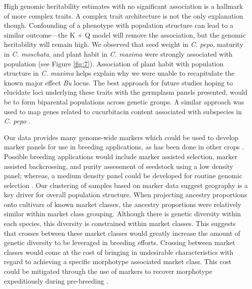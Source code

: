 \documentclass[utf8]{FrontiersinHarvard} %
\begin{document}
High genomic heritability estimates with no significant association is a hallmark of more complex traits. A complex trait architecture is not the only explanation though. Confounding of a phenotype with population structure can lead to a similar outcome---the K + Q model will remove the association, but the genomic heritability will remain high. We observed that seed weight in \textit{C. pepo}, maturity in \textit{C. moschata}, and plant habit in \textit{C. maxima} were strongly associated with population (see Figure \ref{fig:7}). Association of plant habit with population structure in \textit{C. maxima} helps explain why we were unable to recapitulate the known major effect \textit{Bu} locus. The best approach for future studies hoping to elucidate loci underlying these traits with the germplasm panels presented, would be to form biparental populations across genetic groups. A similar approach was used to map genes related to cucurbitacin content associated with subspecies in \textit{C. pepo} \citep{Brzozowski2020}.

Our data provides many genome-wide markers which could be used to develop marker panels for use in breeding applications, as has been done in other crops \citep{Arbelaez2019}. Possible breeding applications would include marker assisted selection, marker assisted backcrossing, and purity assessment of seedstock using a low density panel; whereas, a medium density panel could be developed for routine genomic selection \citep{Cerioli2022}. Our clustering of samples based on marker data suggest geography is a key driver for overall population structure. When projecting ancestry proportions onto cultivars of known market classes, the ancestry proportions were relatively similar within market class grouping. Although there is genetic diversity within each species, this diversity is constrained within market classes. This suggests that crosses between these market classes would greatly increase the amount of genetic diversity to be leveraged in breeding efforts. Crossing between market classes would come at the cost of bringing in undesirable characteristics with regard to achieving a specific morphotype associated market class. This cost could be mitigated through the use of markers to recover morphotype expeditiously during pre-breeding \citep{Cobb2019}. 
\end{document}
